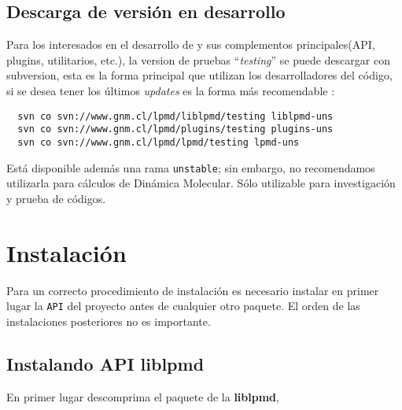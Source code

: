 \subsection{Descarga de versi\'on en desarrollo}

Para los interesados en el desarrollo de {\lpmd} y sus complementos principales(API, plugins, utilitarios, etc.), la version de pruebas ``\textit{testing}'' se puede descargar con subversion, esta es la forma principal que utilizan los desarrolladores del c\'odigo, si se desea tener los \'ultimos \textit{updates} es la forma m\'as recomendable :

\begin{center}
 \begin{verbatim}
  svn co svn://www.gnm.cl/lpmd/liblpmd/testing liblpmd-uns
  svn co svn://www.gnm.cl/lpmd/plugins/testing plugins-uns
  svn co svn://www.gnm.cl/lpmd/lpmd/testing lpmd-uns
 \end{verbatim}
\end{center}

Est\'a disponible adem\'as una rama \verb|unstable|; sin embargo, no recomendamos utilizarla para c\'alculos de Din\'amica Molecular. S\'olo utilizable para investigaci\'on y prueba de c\'odigos.

\section{Instalaci\'on}

Para un correcto procedimiento de instalaci\'on es necesario instalar en primer lugar la \verb|API| del proyecto antes de cualquier otro paquete. El orden de las instalaciones posteriores no es importante.


\subsection{Instalando API liblpmd}

En primer lugar descomprima el paquete de la \textbf{liblpmd},

